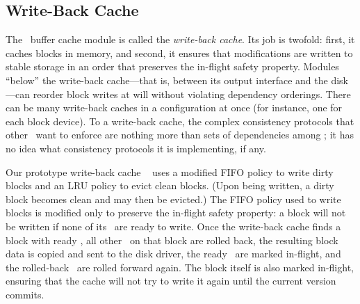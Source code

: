 
\subsection{Write-Back Cache}
\label{sec:modules:wbcache}

The \Kudos\ buffer cache module is called the \emph{write-back cache}.
%
Its job is twofold: first, it caches blocks in memory, and second, it
ensures that modifications are written to stable storage in an order that
preserves the in-flight safety property.
%
Modules ``below'' the write-back cache---that is, between its output
interface and the disk---can reorder block writes at will without violating
dependency orderings.
%
There can be many write-back caches in a configuration at once (for
instance, one for each block device). To a write-back cache, the complex
consistency protocols that other \modules\ want to enforce are nothing more
than sets of dependencies among \patches; it has no idea what consistency
protocols it is implementing, if any.

Our prototype write-back cache \module\ 
%
uses a modified FIFO policy to write dirty blocks and an LRU policy to
evict clean blocks.  (Upon being written, a dirty block becomes clean and
may then be evicted.)
%
The FIFO policy used to write blocks is modified only to preserve the
in-flight safety property: a block will not be written if none of its
\patches\ are ready to write.
%
Once the write-back cache finds a block with ready \patches, all other
\patches\ on that block are rolled back, the resulting block data is copied
and sent to the disk driver, the ready \patches\ are marked in-flight, and
the rolled-back \patches\ are rolled forward again.
%
The block itself is also marked in-flight, ensuring that the cache will not
try to write it again until the current version commits.


